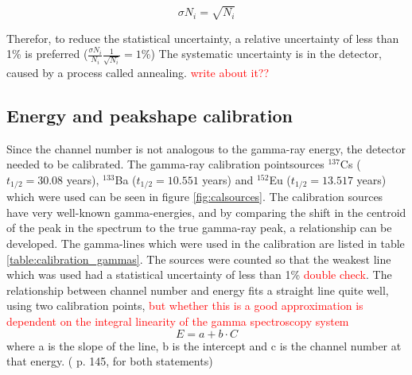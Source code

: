 \begin{equation}
    \sigma N_i = \sqrt{N_i}
\end{equation}

Therefor, to reduce the statistical uncertainty, a relative uncertainty of less than 1\% is preferred ($\frac{\sigma N_i}{N_i}\frac{1}{\sqrt{N_i}}=1\%$) 
The systematic uncertainty is in the detector, caused by a process called annealing. \textcolor{red}{write about it??}


\subsection{Energy and peakshape calibration}  \label{subsec:energy_peakshape_calibration}
Since the channel number is not analogous to the gamma-ray energy, the detector needed to be calibrated. The gamma-ray calibration pointsources  $^{137}$Cs ($t_{1/2}=30.08$ years\cite{Browne2007}), $^{133}$Ba ($t_{1/2}=10.551$ years\cite{Khazov2011}) and $^{152}$Eu ($t_{1/2}=13.517$ years\cite{Martin2013}) which were used can be seen in figure \ref{fig:calsources}. The calibration sources have very well-known gamma-energies, and by comparing the shift in the centroid of the peak in the spectrum to the true gamma-ray peak, a relationship can be developed. The gamma-lines which were used in the calibration are listed in table \ref{table:calibration_gammas}. The sources were counted so that the weakest line which was used had a statistical uncertainty of less than 1\% \textcolor{red}{double check}. The relationship between channel number and energy fits a straight line quite well, using two calibration points, \textcolor{red}{but whether this is a good approximation is dependent on the integral linearity of the gamma spectroscopy system} 
\begin{equation}
    E = a+b\cdot C
\end{equation}
where a is the slope of the line, b is the intercept and c is the channel number at that energy. 
(\cite{Gilmore2008} p. 145, for both statements) \\

